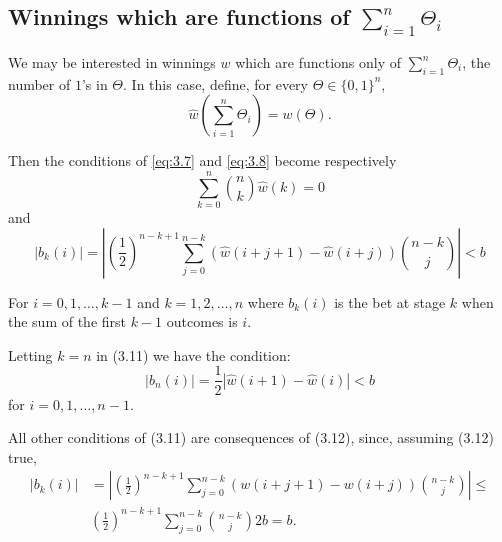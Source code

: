 \documentclass[11pt]{article}
\numberwithin{equation}{section}
\theoremstyle{boldStyle}
\begin{document}
\subsection{Winnings which are functions of $\sum_{i=1}^{n} \Theta_i$}


We may be interested in winnings $w$ which are functions only of $\sum_{i=1}^n \Theta_i$, the number of $1$'s in $\Theta$. In this case, define, for every $\Theta \in \{0, 1\}^n$,
\begin{equation} \label{eq:3.9}
    \hat{w} \left(\sum_{i=1}^n \Theta_i\right) = w(\Theta).
\end{equation}

Then the conditions of \ref{eq:3.7} and \ref{eq:3.8} become respectively
\begin{equation} \label{eq:3.10}
    \sum_{k=0}^n \binom{n}{k} \hat{w}(k) = 0
\end{equation}
and
\begin{equation} \label{eq:3.11}
    \left|b_k(i)\right| = \left|\left(\frac{1}{2}\right)^{n-k+1} \sum_{j=0}^{n-k} \left(\hat{w}(i+j+1) - \hat{w}(i+j)\right) \binom{n-k}{j}\right| < b
\end{equation}

For \(i = 0, 1, \ldots, k - 1\) and \(k = 1, 2, \ldots, n\) where
$b_k(i)$ is the bet at stage \(k\) when the sum of the first \(k - 1\) outcomes is \(i\).

Letting \(k = n\) in (3.11) we have the condition:
\begin{equation} \label{eq:3.12}
    \left |b_n(i) \right| = \frac{1}{2} \left| \hat{w}(i + 1) - \hat{w}(i)\right| < b
\end{equation}
for \(i = 0, 1, \ldots, n - 1\).

All other conditions of (3.11) are consequences of (3.12), since, assuming (3.12) true,
\begin{equation} \label{eq:3.13}
    \begin{aligned}
        \left|b_k(i)\right| &= \left| \left(\frac{1}{2}\right)^{n-k+1} \sum_{j=0}^{n-k} \left(w(i + j + 1) - w(i + j)\right) \binom{n-k}{j} \right| \leq \\
        &\left(\frac{1}{2}\right)^{n-k+1} \sum_{j=0}^{n-k} \binom{n-k}{j} 2b = b.
    \end{aligned}
\end{equation}
\end{document}
